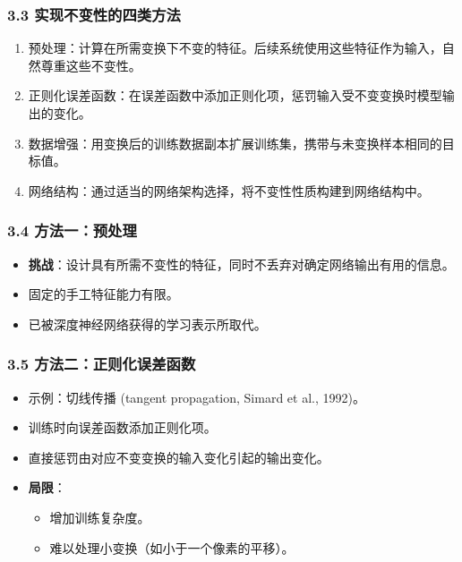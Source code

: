 \documentclass[t,aspectratio=169]{beamer} %
\begin{document}
\begin{frame}
    \frametitle{3.3 实现不变性的四类方法}
    \begin{enumerate}
        \item \alert{预处理}：计算在所需变换下不变的特征。后续系统使用这些特征作为输入，自然尊重这些不变性。
        \item \alert{正则化误差函数}：在误差函数中添加正则化项，惩罚输入受不变变换时模型输出的变化。
        \item \alert{数据增强}：用变换后的训练数据副本扩展训练集，携带与未变换样本相同的目标值。
        \item \alert{网络结构}：通过适当的网络架构选择，将不变性性质构建到网络结构中。
    \end{enumerate}
\end{frame}

\begin{frame}
    \frametitle{3.4 方法一：预处理}
    \begin{itemize}
        \item \textbf{挑战}：设计具有所需不变性的特征，同时\alert{不丢弃}对确定网络输出有用的信息。
        \item 固定的手工特征能力有限。
        \item 已被深度神经网络获得的\alert{学习表示}所取代。
    \end{itemize}
\end{frame}

\begin{frame}
    \frametitle{3.5 方法二：正则化误差函数}
    \begin{itemize}
        \item 示例：\alert{切线传播} (tangent propagation, Simard et al., 1992)。
        \item 训练时向误差函数添加正则化项。
        \item 直接惩罚由对应不变变换的输入变化引起的输出变化。
        \item \textbf{局限}：
        \begin{itemize}
            \item 增加训练复杂度。
            \item 难以处理小变换（如小于一个像素的平移）。
        \end{itemize}
    \end{itemize}
\end{frame}
\end{document}
